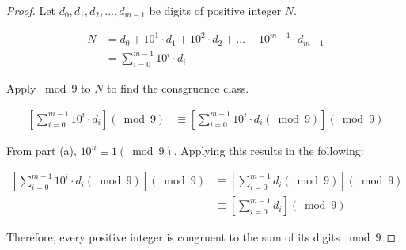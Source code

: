 \documentclass{article}
\begin{document}
\begin{proof}
	Let $d_0, d_1, d_2, \ldots, d_{m-1}$ be digits of positive integer $N$.

	\begin{align*}
		N & = d_0 + 10^1 \cdot d_1 + 10^2 \cdot d_2 + \ldots + 10^{m-1} \cdot d_{m-1} \\
		  & = \sum_{i=0}^{m-1}{10^i \cdot d_i}
	\end{align*}

	Apply $\bmod 9$ to $N$ to find the consgruence class.

	\begin{align*}
		\left[ \sum_{i=0}^{m-1}{10^i \cdot d_i} \right] (\bmod 9) & \equiv \left[ \sum_{i=0}^{m-1}{10^i \cdot d_i (\bmod 9)} \right] (\bmod 9)
	\end{align*}

	From part (a), $10^n \equiv 1 (\bmod 9)$. Applying this results in the following:

	\begin{align*}
		\left[ \sum_{i=0}^{m-1}{10^i \cdot d_i (\bmod 9)} \right] (\bmod 9) & \equiv \left[ \sum_{i=0}^{m-1}{d_i (\bmod 9)} \right] (\bmod 9) \\
		                                                                    & \equiv \left[ \sum_{i=0}^{m-1}{d_i} \right] (\bmod 9)
	\end{align*}

	Therefore, every positive integer is congruent to the sum of its digits $\bmod 9$
\end{proof}
\end{document}
